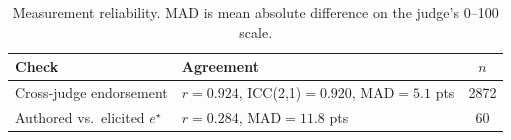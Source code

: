 \begin{table}[t]
\centering
\caption{Measurement reliability. MAD is mean absolute difference on the judge's 0--100 scale.}
\label{tab:reliability}
\begin{tabular}{llc}
\toprule
Check & Agreement & $n$ \\
\midrule
Cross-judge endorsement & $r=0.924$, ICC(2,1)$=0.920$, MAD$=5.1$ pts & 2872 \\
Authored vs.\ elicited $e^{\star}$ & $r=0.284$, MAD$=11.8$ pts & 60 \\
\bottomrule
\end{tabular}
\end{table}
